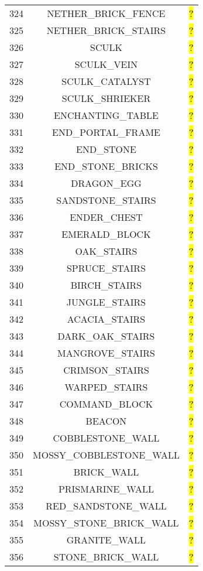 \documentclass[11pt]{article}
\newcommand\myworries[1]{\sethlcolor{red}\hl{#1}}
\begin{document}
\begin{longtable}{ |c|c|c| }
324 & NETHER\_BRICK\_FENCE & \myworries{?} \\
325 & NETHER\_BRICK\_STAIRS & \myworries{?} \\
326 & SCULK & \myworries{?} \\
327 & SCULK\_VEIN & \myworries{?} \\
328 & SCULK\_CATALYST & \myworries{?} \\
329 & SCULK\_SHRIEKER & \myworries{?} \\
330 & ENCHANTING\_TABLE & \myworries{?} \\
331 & END\_PORTAL\_FRAME & \myworries{?} \\
332 & END\_STONE & \myworries{?} \\
333 & END\_STONE\_BRICKS & \myworries{?} \\
334 & DRAGON\_EGG & \myworries{?} \\
335 & SANDSTONE\_STAIRS & \myworries{?} \\
336 & ENDER\_CHEST & \myworries{?} \\
337 & EMERALD\_BLOCK & \myworries{?} \\
338 & OAK\_STAIRS & \myworries{?} \\
339 & SPRUCE\_STAIRS & \myworries{?} \\
340 & BIRCH\_STAIRS & \myworries{?} \\
341 & JUNGLE\_STAIRS & \myworries{?} \\
342 & ACACIA\_STAIRS & \myworries{?} \\
343 & DARK\_OAK\_STAIRS & \myworries{?} \\
344 & MANGROVE\_STAIRS & \myworries{?} \\
345 & CRIMSON\_STAIRS & \myworries{?} \\
346 & WARPED\_STAIRS & \myworries{?} \\
347 & COMMAND\_BLOCK & \myworries{?} \\
348 & BEACON & \myworries{?} \\
349 & COBBLESTONE\_WALL & \myworries{?} \\
350 & MOSSY\_COBBLESTONE\_WALL & \myworries{?} \\
351 & BRICK\_WALL & \myworries{?} \\
352 & PRISMARINE\_WALL & \myworries{?} \\
353 & RED\_SANDSTONE\_WALL & \myworries{?} \\
354 & MOSSY\_STONE\_BRICK\_WALL & \myworries{?} \\
355 & GRANITE\_WALL & \myworries{?} \\
356 & STONE\_BRICK\_WALL & \myworries{?} \\

\end{longtable}
\end{document}
